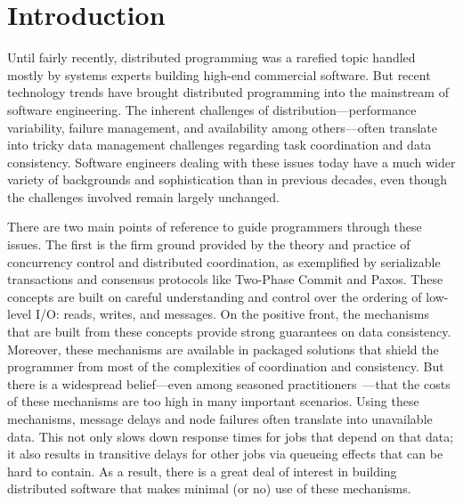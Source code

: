 \section{Introduction}

Until fairly recently, distributed programming was a rarefied topic handled mostly by systems experts building high-end commercial software. But recent technology trends have brought distributed programming into the mainstream of software engineering.  The inherent challenges of distribution---performance variability, failure management, and availability among others---often translate into tricky data management challenges regarding task coordination and data consistency.  Software engineers dealing with these issues today have a much wider variety of backgrounds and sophistication than in previous decades, even though the challenges involved remain largely unchanged.

There are two main points of reference to guide programmers through these issues.  The first is the firm ground provided by the theory and practice of concurrency control and distributed coordination, as exemplified by serializable transactions and consensus protocols like Two-Phase Commit and Paxos.  These concepts are built on careful understanding and control over the ordering of low-level I/O: reads, writes, and messages.  On the positive front, the mechanisms that are built from these concepts provide strong guarantees on data consistency.  Moreover, these mechanisms are available in packaged solutions that shield the programmer from most of the complexities of coordination and consistency.  But there is a widespread belief---even among seasoned practitioners~\cite{ladis}---that the costs of these mechanisms are too high in many important scenarios.  Using these mechanisms, message delays and node failures often translate into unavailable data. This not only slows down response times for jobs that depend on that data; it also results in transitive delays for other jobs via queueing effects that can be hard to contain.  As a result, there is a great deal of interest in building distributed software that makes minimal (or no) use of these mechanisms.


